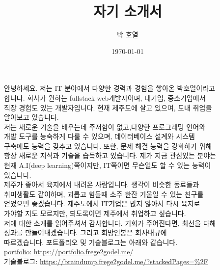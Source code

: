 \documentclass[11pt]{article}
\author{박 호열}
\date{\today}
\title{자기 소개서}
\begin{document}
\maketitle
안녕하세요. 저는 IT 분야에서 다양한 경력과 경험을 쌓아온 박호열이라고\\[0pt]
합니다. 회사가 원하는 fullstack web개발자이며, 대기업, 중소기업에서\\[0pt]
직장 경험도 있는 개발자입니다. 현재 제주도에 살고 있으며, 도내 취업을\\[0pt]
알아보고 있습니다.\\[0pt]


저는 새로운 기술을 배우는데 주저함이 없고,다양한 프로그래밍 언어와\\[0pt]
개발 도구를 능숙하게 다룰 수 있으며, 데이터베이스 설계와 시스템\\[0pt]
구축에도 능력을 갖추고 있습니다. 또한, 문제 해결 능력을 강화하기 위해\\[0pt]
항상 새로운 지식과 기술을 습득하고 있습니다. 제가 지금 관심있는 분야는\\[0pt]
현재 A.I(deep learning)쪽이지만, IT쪽이면 무슨일도 할 수 있는 능력이\\[0pt]
있습니다.\\[0pt]

제주가 좋아서 육지에서 내려온 사람입니다. 생각이 비슷한 동료들과\\[0pt]
취미생활도 같이하며, 괴롭고 힘들때 소주 한잔 기울일 수 있는 친구를\\[0pt]
얻었으면 좋겠습니다. 제주도에서 IT기업은 많지 않아서 다시 육지로\\[0pt]
가야할 지도 모르지만, 되도록이면 제주에서 취업하고 싶습니다.\\[0pt]

저에 대한 소개를 읽어주셔서 감사합니다. 기회가 주어진다면, 최선을 다해\\[0pt]
성과를 만들어내겠습니다. 그리고 희망연봉은 회사내규에\\[0pt]
따르겠습니다. 포트폴리오 및 기술블로그는 아래와 같습니다.\\[0pt]

portfolio: \url{https://portfolio.frege2godel.me/}\\[0pt]
기술블로그: \url{https://braindump.frege2godel.me/?stackedPages=\%2F}\\[0pt]
\end{document}
